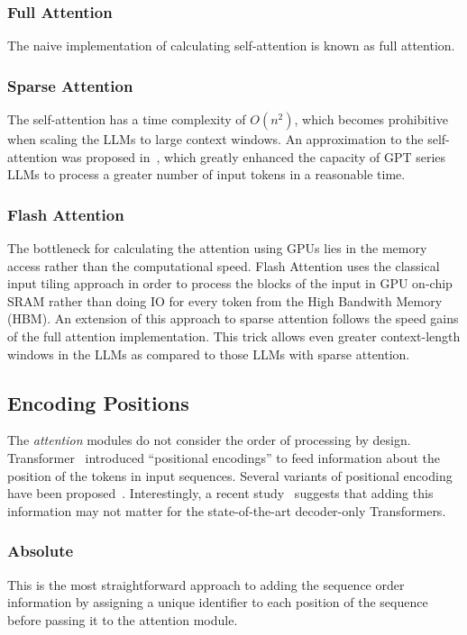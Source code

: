 \subsubsection{Full Attention}
\label{ss:fullattention}
The naive implementation of calculating self-attention is known as full attention.

\subsubsection{Sparse Attention~\cite{sparse_transformer}}
\label{ss:sparseattention}
The self-attention has a time complexity of $O(n^2)$, which becomes prohibitive when scaling the LLMs to large context windows. An approximation to the self-attention was proposed in~\cite{sparse_transformer}, which greatly enhanced the capacity of GPT series LLMs to process a greater number of input tokens in a reasonable time.

\subsubsection{Flash Attention~\cite{flashattention}}
\label{ss:flashattention}
The bottleneck for calculating the attention using GPUs lies in the memory access rather than the computational speed. Flash Attention uses the classical input tiling approach in order to process the blocks of the input in GPU on-chip SRAM rather than doing IO for every token from the High Bandwith Memory (HBM). An extension of this approach to sparse attention follows the speed gains of the full attention implementation. This trick allows even greater context-length windows in the LLMs as compared to those LLMs with sparse attention.

\subsection{Encoding Positions}
\label{ss:encodingposition}
The \textit{attention} modules do not consider the order of processing by design. Transformer~\cite{Transformers} introduced \enquote{positional encodings} to feed information about the position of the tokens in input sequences. Several variants of positional encoding have been proposed~\cite{alibi, su2021roformer}. Interestingly, a recent study~\cite{NoPE} suggests that adding this information may not matter for the state-of-the-art decoder-only Transformers.

\subsubsection{Absolute}
This is the most straightforward approach to adding the sequence order information by assigning a unique identifier to each position of the sequence before passing it to the attention module.

